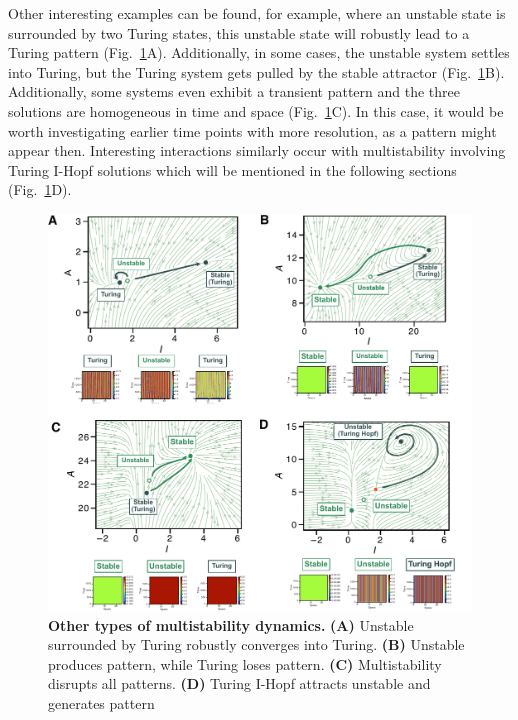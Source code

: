 Other interesting examples can be found, for example, where an unstable state is surrounded by two Turing states, this unstable state will robustly lead to a Turing pattern (Fig.~\ref{fig:multistability_leftover}A).
Additionally, in some cases, the unstable system settles into Turing, but the Turing system gets pulled by the stable attractor (Fig.~\ref{fig:multistability_leftover}B). Additionally, some systems even exhibit a transient pattern and the three solutions are homogeneous in time and space (Fig.~\ref{fig:multistability_leftover}C).
In this case, it would be worth investigating earlier time points with more resolution, as a pattern might appear then.
Interesting interactions similarly occur with multistability involving Turing I-Hopf solutions which will be mentioned in the following sections (Fig.~\ref{fig:multistability_leftover}D).


\begin{figure}[H] %
    \centering
    \begin{adjustbox}{center}
    \includegraphics[width=1.2\textwidth]{chapters/Chapter 1/multistability_leftover} %
    \end{adjustbox}
    \caption{\textbf{Other types of multistability dynamics.} \textbf{(A)} Unstable surrounded by Turing robustly converges into Turing. \textbf{(B)} Unstable produces pattern, while Turing loses pattern. \textbf{(C)} Multistability disrupts all patterns. \textbf{(D)} Turing I-Hopf attracts unstable and generates pattern}
    \label{fig:multistability_leftover} %
\end{figure}


